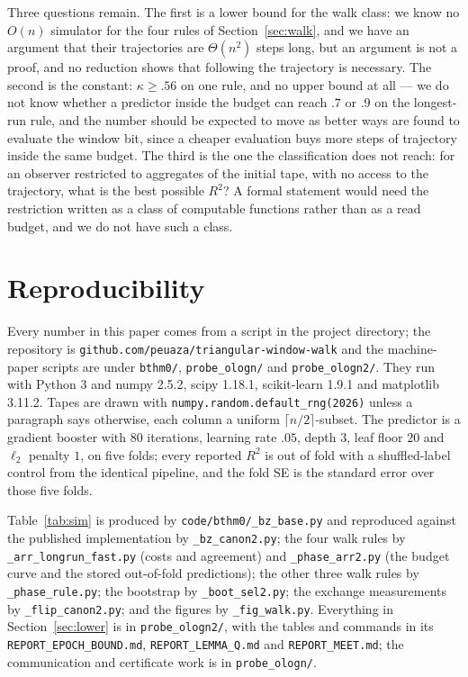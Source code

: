 \documentclass[11pt]{article}
\begin{document}
Three questions remain. The first is a lower bound for the walk class: we know no $O(n)$ simulator for
the four rules of Section~\ref{sec:walk}, and we have an argument that their trajectories are
$\Theta(n^2)$ steps long, but an argument is not a proof, and no reduction shows that following the
trajectory is necessary. The second is the constant: $\kappa\ge.56$ on one rule, and no
upper bound at all --- we do not know whether a predictor inside the budget can reach $.7$ or $.9$ on
the longest-run rule, and the number should be expected to move as better ways are found to evaluate
the window bit, since a cheaper evaluation buys more steps of trajectory inside the same budget. The
third is the one the classification does not reach: for an observer restricted to aggregates of the
initial tape, with no access to the trajectory, what is the best possible $R^2$? A formal statement
would need the restriction written as a class of computable functions rather than as a read budget,
and we do not have such a class.

\section*{Reproducibility}

Every number in this paper comes from a script in the project directory; the repository is
\texttt{github.com/peuaza/triangular-window-walk} and the machine-paper scripts are under
\texttt{bthm0/}, \texttt{probe\_ologn/} and \texttt{probe\_ologn2/}. They run with Python 3 and numpy 2.5.2,
scipy 1.18.1, scikit-learn 1.9.1 and matplotlib 3.11.2. Tapes are drawn with
\texttt{numpy.random.default\_rng(2026)} unless a paragraph says otherwise, each column a uniform
$\lceil n/2\rceil$-subset. The predictor is a gradient booster with 80 iterations, learning rate
$.05$, depth $3$, leaf floor $20$ and $\ell_2$ penalty $1$, on five folds; every reported $R^2$ is
out of fold with a shuffled-label control from the identical pipeline, and the fold SE is the
standard error over those five folds.

Table~\ref{tab:sim} is produced by \texttt{code/bthm0/\_bz\_base.py} and reproduced against the
published implementation by \texttt{\_bz\_canon2.py}; the four walk rules by
\texttt{\_arr\_longrun\_fast.py} (costs and agreement) and \texttt{\_phase\_arr2.py} (the budget
curve and the stored out-of-fold predictions); the other three walk rules by
\texttt{\_phase\_rule.py}; the bootstrap by \texttt{\_boot\_sel2.py}; the exchange measurements by
\texttt{\_flip\_canon2.py}; and the figures by \texttt{\_fig\_walk.py}. Everything in
Section~\ref{sec:lower} is in \texttt{probe\_ologn2/}, with the tables and commands in its
\texttt{REPORT\_EPOCH\_BOUND.md}, \texttt{REPORT\_LEMMA\_Q.md} and \texttt{REPORT\_MEET.md}; the
communication and certificate work is in \texttt{probe\_ologn/}.
\end{document}
